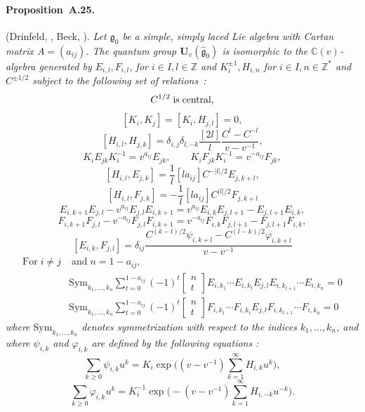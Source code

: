 \documentclass[a4paper,10pt]{amsart}
\def\Z{\mathbb{Z}}
\def\U{\mathbf{U}}
\def\C{\mathbb{C}}
\def\g{\mathfrak{g}}
\numberwithin{equation}{section}
\begin{document}
{\paragraph{\textbf{Proposition~A.25.}}(Drinfeld, \cite{Drinfeld}, Beck, \cite{Beck}). \textit{ Let $\g_0$ be a simple, simply laced Lie algebra with Cartan matrix $A=(a_{ij})$. The quantum group $\U_v(\widehat{\g}_0)$ is isomorphic to the $\C(v)$-algebra generated by $E_{i,l}, F_{i,l}$, for $i \in I, l \in \Z$ and $K^{\pm 1}_{i}, H_{i,n}$ for $i \in I, n \in \Z^*$ and $C^{\pm 1/2}$ subject to the following set of relations~:
$$C^{1/2} \;\text{is\;central},$$
$$ [K_i,K_j]=[K_i,H_{j,l}]=0,$$
$$[H_{i,l},H_{j,k}]=\delta_{i,j}\delta_{l,-k}\frac{[2l]}{l} \frac{C^l-C^{-l}}{v-v^{-1}},$$
$$K_i E_{jk}K_{i}^{-1}=v^{a_{ij}}E_{jk}, \qquad K_i F_{jk}K_{i}^{-1}=v^{-a_{ij}}F_{jk},$$
$$[H_{i,l},E_{j,k}]= \frac{1}{l}[la_{ij}]C^{-|l|/2}E_{j,k+l}, $$
\begin{equation}\label{E:drinfeldpres}
 [H_{i,l},F_{j,k}]= -\frac{1}{l}[la_{ij}]C^{|l|/2}F_{j,k+l}
 \end{equation}
$$E_{i,k+1}E_{j,l}-v^{a_{ij}}E_{j,l}E_{i,k+1}=
v^{a_{ij}}E_{i,k}E_{j,l+1}-E_{j,l+1}E_{i,k},$$
$$F_{i,k+1}F_{j,l}-v^{-a_{ij}}F_{j,l}F_{i,k+1}=
v^{-a_{ij}}F_{i,k}F_{j,l+1}-F_{j,l+1}F_{i,k},$$
$$[E_{i,k},F_{j,l}]=\delta_{ij}
\frac{C^{(k-l)/2}\psi_{i,k+l}-C^{(l-k)/2}\varphi_{i,k+l}}{v-v^{-1}}$$
\begin{equation*}
\begin{split}
\mathrm{For\;}i \neq j&\;\mathrm{and\;}n=1-a_{ij},\\
&\mathrm{Sym}_{k_1, \ldots, k_n} \sum_{t=0}^{1-a_{ij}}(-1)^t
\begin{bmatrix} n \\ t \end{bmatrix} E_{i,k_1} \cdots E_{i,k_t}E_{j,l}
E_{i,k_{t+1}} \cdots E_{i,k_n}=0\\
&\mathrm{Sym}_{k_1, \ldots, k_n} \sum_{t=0}^{1-a_{ij}}(-1)^t
\begin{bmatrix} n \\ t \end{bmatrix} F_{i,k_1} \cdots F_{i,k_t}E_{j,l}
F_{i,k_{t+1}} \cdots F_{i,k_n}=0
\end{split}
\end{equation*}
where $\mathrm{Sym}_{k_1, \ldots, k_n}$ denotes symmetrization with respect
to the indices $k_1, \ldots , k_n$, and where $\psi_{i,k}$ and $\varphi_{i,k}$
are defined by the following equations :
$$\sum_{k \geq 0} \psi_{i,k}u^k=K_i \exp\bigg( (v-v^{-1})
\sum_{k=1}^\infty H_{i,k}u^k\bigg),$$
$$\sum_{k \geq 0} \varphi_{i,k}u^k=K_i^{-1} \exp\bigg( -(v-v^{-1})
\sum_{k=1}^\infty H_{i,-k}u^{-k}\bigg).$$}

}
\end{document}
